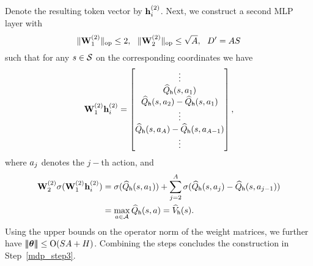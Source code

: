  Denote the resulting token vector by ${\mathbf h}_i^{(2)}$.
 Next, we construct a second MLP layer with $$\|{{\mathbf W}_1^{(2)}}\|_{\mathrm{op}}\leq2,~~\|{{\mathbf W}_2^{(2)}}\|_{\mathrm{op}}\leq\sqrt{{A}},~~{D'}={A}{S}
 $$ such that for any ${s}\in{\mathcal{S}}$ on the corresponding coordinates we have
 \begin{align*}
     {\mathbf W}_1^{(2)}{\mathbf h}_i^{(2)}=\begin{bmatrix}
        \vdots\\ {\widehat{{Q}}}_{\mathsf{h}}({s},{a}_1)\\
         {\widehat{{Q}}}_{\mathsf{h}}({s},{a}_2)-{\widehat{{Q}}}_{\mathsf{h}}({s},{a}_1)\\
         \vdots\\
          {\widehat{{Q}}}_{\mathsf{h}}({s},{a}_{A})-{\widehat{{Q}}}_{\mathsf{h}}({s},{a}_{{A}-1})
    \\ \vdots\end{bmatrix},
 \end{align*}
 where ${a}_j$ denotes the $j-$th action, 
 and 
 \begin{align*}
  {\mathbf W}^{(2)}_2\sigma({\mathbf W}^{(2)}_1{\mathbf h}_i^{(2)})
 &=
 \sigma({\widehat{{Q}}}_{\mathsf{h}}({s},{a}_1))+\sum_{j=2}^{A}\sigma( {\widehat{{Q}}}_{\mathsf{h}}({s},{a}_j)-{\widehat{{Q}}}_{\mathsf{h}}({s},{a}_{j-1}))\\
 &=\max_{{a}\in{\mathcal{A}}}{\widehat{{Q}}}_{\mathsf{h}}({s},{a})={\widehat{{{V}}}}_{\mathsf{h}}({s}).
 \end{align*}
 Using the upper bounds on the operator norm of the  weight matrices, we further have ${\left|\!\left|\!\left|{{{\boldsymbol \theta}}}\right|\!\right|\!\right|}\leq{\mathrm{O}}({S}{A}+{H})$. 
Combining the steps concludes the construction in Step~\ref{mdp_step3}. 

 
 
